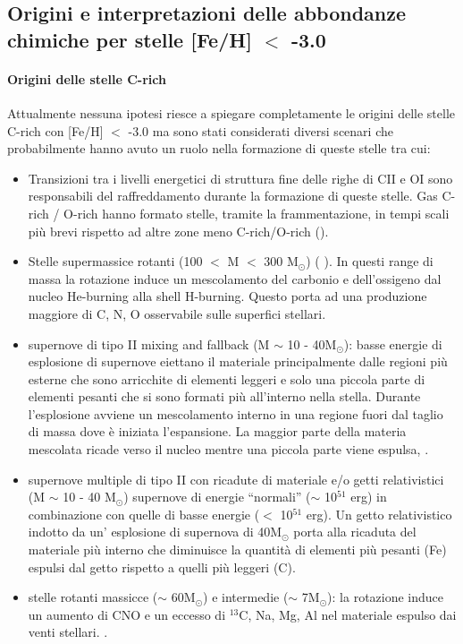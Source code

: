 \documentclass[12pt]{article}
\begin{document}
\subsection{Origini e interpretazioni delle abbondanze chimiche per stelle [Fe/H] $<$ -3.0}
\label{crich_origin}

\paragraph{Origini delle stelle C-rich}
Attualmente nessuna ipotesi riesce a spiegare completamente le origini delle stelle C-rich con [Fe/H] $<$ -3.0 ma sono stati considerati diversi scenari che probabilmente hanno avuto un ruolo nella formazione di queste stelle tra cui:
\begin{itemize}

\item Transizioni tra i livelli energetici di struttura fine delle righe di CII e OI sono responsabili del raffreddamento durante la formazione di queste stelle. Gas C-rich / O-rich hanno formato stelle, tramite la frammentazione, in tempi scali più brevi rispetto ad altre zone meno C-rich/O-rich (\cite{Frebel2007}). 
\item Stelle supermassice rotanti (100 $<$ M $<$ 300 M$_{\odot}$) ( \cite{Fryer}). In questi range di massa la rotazione induce un mescolamento del carbonio e dell’ossigeno dal nucleo He-burning alla shell H-burning.  Questo porta ad una produzione maggiore di C, N, O osservabile sulle superfici stellari.
\item supernove di tipo II mixing and fallback (M $\sim$ 10 - 40M$_{\odot}$): basse energie di esplosione di supernove eiettano il materiale principalmente dalle regioni più esterne che sono arricchite di elementi leggeri e solo una piccola parte di elementi pesanti che si sono formati più all’interno nella stella. Durante l’esplosione avviene un mescolamento interno in una regione fuori dal taglio di massa dove è iniziata l’espansione. La maggior parte della materia mescolata ricade verso il nucleo mentre una piccola parte viene espulsa, \cite{iwamoto}.

\item supernove multiple di tipo II con ricadute di materiale e/o getti relativistici (M $\sim$ 10 - 40 M$_{\odot}$) supernove di energie “normali” ($\sim$ 10$^{51}$ erg) in combinazione con quelle di basse energie ($<$ 10$^{51}$ erg). Un getto relativistico indotto da un’ esplosione di supernova di 40M$_{\odot}$ porta alla ricaduta del materiale più interno che diminuisce la quantità di elementi più pesanti (Fe) espulsi dal getto rispetto a quelli più leggeri (C). \cite{Tominaga}

\item stelle rotanti massicce ($\sim$ 60M$_{\odot}$) e intermedie ($\sim$ 7M$_{\odot}$): la rotazione induce un aumento di CNO e un eccesso di $^{13}$C, Na, Mg, Al nel materiale espulso dai venti stellari. \cite{Meynet}.

\end{itemize}
\end{document}
